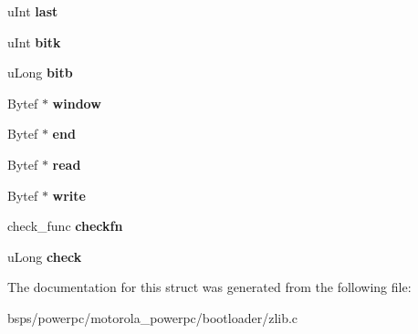 \begin{DoxyCompactItemize}
\begin{tabbing}
\end{tabbing}\item 
\mbox{\label{structinflate__blocks__state_aff9036e9472bff599712d2cabbae8efb}} 
u\+Int {\bfseries last}
\item 
\mbox{\label{structinflate__blocks__state_aa746d10a5f7cab2603c2282c24a10a94}} 
u\+Int {\bfseries bitk}
\item 
\mbox{\label{structinflate__blocks__state_a14a41e3af6a60ac4bc69e299820a3999}} 
u\+Long {\bfseries bitb}
\item 
\mbox{\label{structinflate__blocks__state_a9585c3f7e1653e8bf31685b8fc4bb5da}} 
Bytef $\ast$ {\bfseries window}
\item 
\mbox{\label{structinflate__blocks__state_a3e7b6ce115fec031c6413fc7259f0206}} 
Bytef $\ast$ {\bfseries end}
\item 
\mbox{\label{structinflate__blocks__state_a9508224b8104718e7a576149586b9b77}} 
Bytef $\ast$ {\bfseries read}
\item 
\mbox{\label{structinflate__blocks__state_a82ae3c57d9b8acffa4deb7e4a9354297}} 
Bytef $\ast$ {\bfseries write}
\item 
\mbox{\label{structinflate__blocks__state_af1238e2d5076a2b3c0d21430252e890c}} 
check\+\_\+func {\bfseries checkfn}
\item 
\mbox{\label{structinflate__blocks__state_a917b3b14339ec368de13c3ba07c1711e}} 
u\+Long {\bfseries check}
\end{DoxyCompactItemize}


The documentation for this struct was generated from the following file\+:\begin{DoxyCompactItemize}
\item 
bsps/powerpc/motorola\+\_\+powerpc/bootloader/zlib.\+c\end{DoxyCompactItemize}
